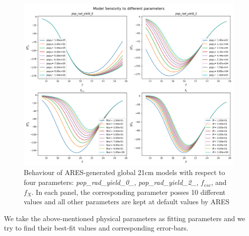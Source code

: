 \documentclass[12pt, TexShade, letterpaper]{report}
\begin{document}
\begin{figure}[h!]
\centering
\includegraphics[scale =0.6]{sensivity.png}
\caption[Behaviour of global 21cm model in reaction to change in four parameter]{Behaviour of ARES-generated global 21cm models with respect to four parameters: \emph{pop\_rad\_yield\_0\_}, \emph{pop\_rad\_yield\_2\_}, $f_{esc}$, and $f_X$. In each panel, the corresponding parameter posses 10 different values and all other parameters are kept at default values by ARES}
\label{fig:sensivity}
\end{figure}
We take the above-mentioned physical parameters as fitting parameters and we try to find their best-fit values and corresponding error-bars.\par
\end{document}
